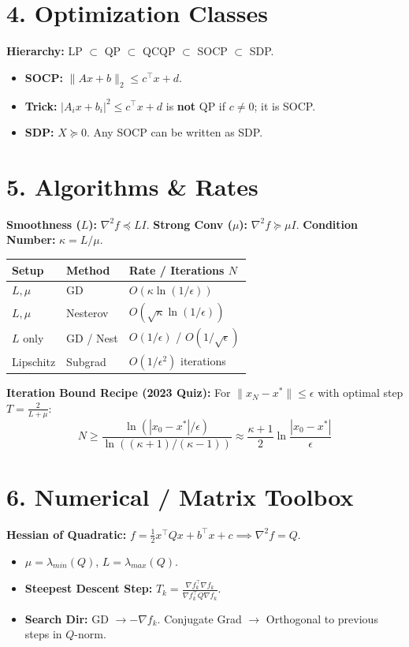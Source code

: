 \section{4. Optimization Classes}
\textbf{Hierarchy:} LP $\subset$ QP $\subset$ QCQP $\subset$ SOCP $\subset$ SDP.
\begin{itemize}[leftmargin=*]
  \item \textbf{SOCP:} $\|Ax+b\|_2 \le c^\top x + d$.
  \item \textbf{Trick:} $|A_i x + b_i|^2 \le c^\top x + d$ is
    \textbf{not} QP if $c \neq 0$; it is SOCP.
  \item \textbf{SDP:} $X \succeq 0$. Any SOCP can be written as SDP.
\end{itemize}

\section{5. Algorithms \& Rates}
\textbf{Smoothness ($L$):} $\nabla^2 f \preceq LI$. \textbf{Strong
Conv ($\mu$):} $\nabla^2 f \succeq \mu I$.
\textbf{Condition Number:} $\kappa = L/\mu$.
\begin{table}[H]
  \footnotesize
  \begin{tabular}{@{}lll@{}}
    \toprule
    \textbf{Setup} & \textbf{Method} & \textbf{Rate / Iterations $N$}
    \\ \midrule
    $L, \mu$ & GD & $O(\kappa \ln(1/\epsilon))$ \\
    $L, \mu$ & Nesterov & $O(\sqrt{\kappa} \ln(1/\epsilon))$ \\
    $L$ only & GD / Nest & $O(1/\epsilon)$ / $O(1/\sqrt{\epsilon})$ \\
    Lipschitz & Subgrad & $O(1/\epsilon^2)$ iterations \\ \bottomrule
  \end{tabular}
\end{table}

\textbf{Iteration Bound Recipe (2023 Quiz):}
For $\|x_N - x^*\| \le \epsilon$ with optimal step $T = \frac{2}{L+\mu}$:
\[ N \ge \frac{\ln(|x_0 - x^*|/\epsilon)}{\ln((\kappa+1)/(\kappa-1))}
\approx \frac{\kappa+1}{2} \ln \frac{|x_0-x^*|}{\epsilon} \]

\section{6. Numerical / Matrix Toolbox}
\textbf{Hessian of Quadratic:} $f = \frac{1}{2}x^\top Q x + b^\top x
+ c \implies \nabla^2 f = Q$.
\begin{itemize}[leftmargin=*]
  \item $\mu = \lambda_{min}(Q)$, $L = \lambda_{max}(Q)$.
  \item \textbf{Steepest Descent Step:} $T_k = \frac{\nabla f_k^\top
    \nabla f_k}{\nabla f_k^\top Q \nabla f_k}$.
  \item \textbf{Search Dir:} GD $\to -\nabla f_k$. Conjugate Grad
    $\to$ Orthogonal to previous steps in $Q$-norm.
\end{itemize}


